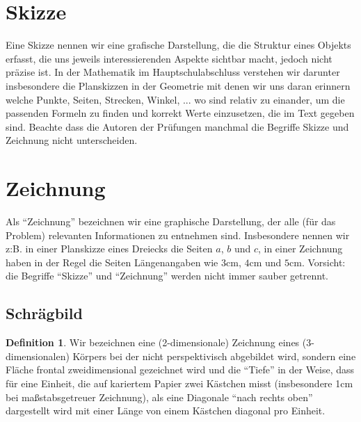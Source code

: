 \documentclass[a4paper]{book}%
\theoremstyle{definition}
\newtheorem{definition}{Definition}
\begin{document}
\section{Skizze}

Eine Skizze nennen wir eine grafische Darstellung, die die Struktur eines Objekts erfasst, die uns jeweils interessierenden Aspekte sichtbar macht, jedoch nicht präzise ist. In der Mathematik im Hauptschulabschluss verstehen wir darunter insbesondere die Planskizzen in der Geometrie mit denen wir uns daran erinnern welche Punkte, Seiten, Strecken, Winkel, ... wo sind relativ zu einander, um die passenden Formeln zu finden und korrekt Werte einzusetzen, die im Text gegeben sind. Beachte dass die Autoren der Prüfungen manchmal die Begriffe Skizze und Zeichnung nicht unterscheiden.


\section{Zeichnung}

Als \enquote{Zeichnung} bezeichnen wir eine graphische Darstellung, der alle (für das Problem) relevanten Informationen zu entnehmen sind. Insbesondere nennen wir z:B. in einer Planskizze eines Dreiecks die Seiten $a$, $b$ und $c$, in einer Zeichnung haben in der Regel die Seiten Längenangaben wie $3 \text{cm}$, $4 \text{cm}$ und $5 \text{cm}$. Vorsicht: die Begriffe \enquote{Skizze} und \enquote{Zeichnung} werden nicht immer sauber getrennt.


\subsection{Schrägbild}\label{Schrägbild}

\begin{definition}
    Wir bezeichnen eine (2-dimensionale) Zeichnung eines (3-dimensionalen) Körpers bei der nicht perspektivisch abgebildet wird, sondern eine Fläche frontal zweidimensional gezeichnet wird und die \enquote{Tiefe} in der Weise, dass für eine Einheit, die auf kariertem Papier zwei Kästchen misst (insbesondere 1cm bei maßstabsgetreuer Zeichnung), als eine Diagonale \enquote{nach rechts oben} dargestellt wird mit einer Länge von einem Kästchen diagonal pro Einheit.
\end{definition}
\end{document}

